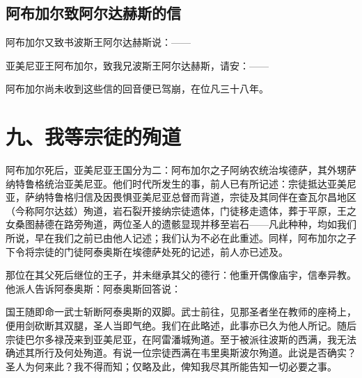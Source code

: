 
\subsection{阿布加尔致阿尔达赫斯的信}

阿布加尔又致书波斯王阿尔达赫斯说：——\par

亚美尼亚王阿布加尔，致我兄波斯王阿尔达赫斯，请安：——\par

\par

阿布加尔尚未收到这些信的回音便已驾崩，在位凡三十八年。\par


\section{九、我等宗徒的殉道}

阿布加尔死后，亚美尼亚王国分为二：阿布加尔之子阿纳农统治埃德萨，其外甥萨纳特鲁格统治亚美尼亚。他们时代所发生的事，前人已有所记述：宗徒抵达亚美尼亚，萨纳特鲁格归信及因畏惧亚美尼亚总督而背道，宗徒及其同伴在查瓦尔昌地区（今称阿尔达兹）殉道，岩石裂开接纳宗徒遗体，门徒移走遗体，葬于平原，王之女桑图赫德在路旁殉道，两位圣人的遗骸显现并移至岩石——凡此种种，均如我们所说，早在我们之前已由他人记述；我们认为不必在此重述。同样，阿布加尔之子下令将宗徒的门徒阿泰奥斯在埃德萨处死的记述，前人亦已述及。\par

那位在其父死后继位的王子，并未继承其父的德行：他重开偶像庙宇，信奉异教。他派人告诉阿泰奥斯：阿泰奥斯回答说：\par

国王随即命一武士斩断阿泰奥斯的双脚。武士前往，见那圣者坐在教师的座椅上，便用剑砍断其双腿，圣人当即气绝。我们在此略述，此事亦已久为他人所记。随后宗徒巴尔多禄茂来到亚美尼亚，在阿雷潘城殉道。至于被派往波斯的西满，我无法确述其所行及何处殉道。有说一位宗徒西满在韦里奥斯波尔殉道。此说是否确实？圣人为何来此？我不得而知；仅略及此，俾知我尽其所能告知一切必要之事。\par

